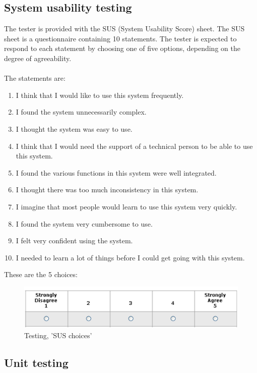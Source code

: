\subsection{System usability testing}
The tester is provided with the SUS (System Usability Score) sheet. The SUS sheet is a questionnaire containing 10 statements. The tester is expected to respond to each statement by choosing one of five options, depending on the degree of agreeability.\\
\\
The statements are:
\begin{enumerate} \setlength{\itemsep}{0cm}\setlength{\parskip}{0cm}
	\item I think that I would like to use this system frequently.
	\item I found the system unnecessarily complex.
	\item I thought the system was easy to use.
	\item I think that I would need the support of a technical person to be able to use this system.
	\item I found the various functions in this system were well integrated.
	\item I thought there was too much inconsistency in this system.
	\item I imagine that most people would learn to use this system very quickly.
	\item I found the system very cumbersome to use.
	\item I felt very confident using the system.
	\item I needed to learn a lot of things before I could get going with this system.
\end{enumerate}
These are the 5 choices:

\begin{figure}[H]
  \centering
    \includegraphics[width=1.0\textwidth]{img/sus-responses.png}
  \caption{Testing, 'SUS choices'} 
  \label{fig:paperPrototype}
\end{figure}





\subsection{Unit testing}

